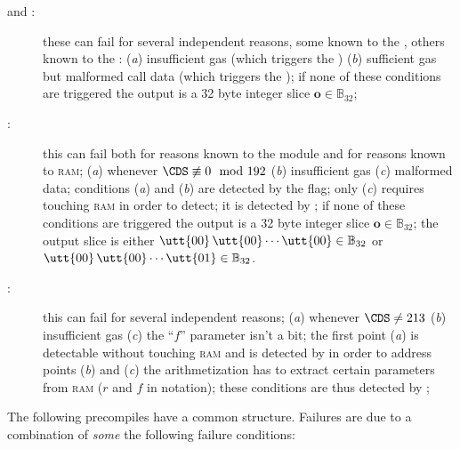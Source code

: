 \begin{description}
	\item[ and :]
		these can fail for several independent reasons, some known to the \hubMod{}, others known to the \mmuMod{}:
		(\emph{a}) insufficient gas (which triggers the \scenPrcFailureKnownToHub{})
		(\emph{b}) sufficient gas but malformed call data (which triggers the \scenPrcFailureKnownToRam{});
		if none of these conditions are triggered the output is a 32 byte integer slice $\textbf{o} \in \mathbb{B}_{32}$;
	\item[:]
		this can fail both for reasons known to the \hubMod{} module and for reasons known to \textsc{ram};
		(\emph{a}) whenever $\CDS \not\equiv 0 \mod 192$
		(\emph{b}) insufficient gas
		(\emph{c}) malformed data;
		conditions (\emph{a}) and (\emph{b}) are detected by the \scenPrcFailureKnownToHub{} flag;
		only (\emph{c}) requires touching \textsc{ram} in order to detect;
		it is detected by \scenPrcFailureKnownToRam{};
		if none of these conditions are triggered the output is a 32 byte integer slice $\textbf{o} \in \mathbb{B}_{32}$;
		the output slice is either
		$
		\utt{00}\,
		\utt{00} \cdots
		\utt{00} \in \mathbb{B}_{32}$
		or
		$
		\utt{00}\,
		\utt{00} \cdots
		\utt{01} \in \mathbb{B}_{32}$.
	\item[:]
		this can fail for several independent reasons;
		(\emph{a}) whenever $\CDS \neq 213$
		(\emph{b}) insufficient gas
		(\emph{c}) the ``$f$'' parameter isn't a bit;
		the first point (\emph{a}) is detectable without touching \textsc{ram} and is detected by \scenPrcFailureKnownToHub{} 
		in order to address points (\emph{b}) and (\emph{c}) the arithmetization has to extract certain parameters from \textsc{ram} ($r$ and $f$ in \cite{EYP-London} notation);
		these conditions are thus detected by \scenPrcFailureKnownToRam{};
\end{description}
The following precompiles have a common structure.
Failures are due to a combination of \emph{some} the following failure conditions:
